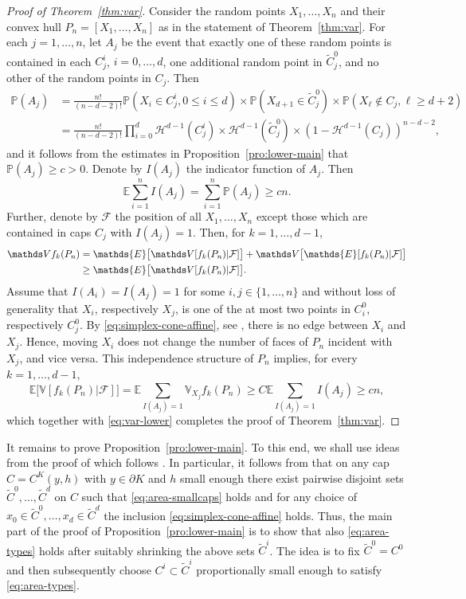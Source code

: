 \documentclass[12pt]{article}
\newcommand{\IE}{\mathds{E}}
\newcommand{\IP}{\mathds{P}}
\def\V{{\mathds V}}
\def\cF{{\mathcal F}}
\def\cH{{\mathcal H}}
\theoremstyle{definition}
\begin{document}
\begin{proof}[Proof of Theorem~\ref{thm:var}]
Consider the random points $X_1,\dots,X_n$ and their convex hull $P_n=[X_1,\dots,X_n]$ as in the statement of Theorem~\ref{thm:var}. For each $j=1,\dots,n$, let $A_j$ be the event that exactly one of these random points is contained in each $C^i_j$, $i=0,\dots,d$, one additional random point in $\tilde{C}_j^0$, and no other of the random points in $C_j$. Then
\begin{align*}
\IP(A_j)
&=\frac{n!}{(n-d-2)!}\IP(X_i\in C^{i}_j,0\le i\le d)\times\IP(X_{d+1}\in \tilde{C}_j^0)\times\IP(X_{\ell}\not\in C_j,\ell\ge d+2)\\
&=\frac{n!}{(n-d-2)!}\prod_{i=0}^d\cH^{d-1}(C^i_j)\times \cH^{d-1}(\tilde{C}_j^0)\times(1-\cH^{d-1}(C_j))^{n-d-2},
\end{align*}
and it follows from the estimates in Proposition~\ref{pro:lower-main} that $\IP(A_j)\ge c>0$.  Denote by $I(A_j)$ the indicator function of $A_j$. Then
\[
\IE\sum_{i=1}^{n}I(A_j)
= \sum_{i=1}^{n}\IP(A_j)
\ge c n.
\]
Further, denote by $\cF$ the position of all $X_1,\dots,X_n$ except those which are contained in caps $C_j$ with $I(A_j)=1$. Then, for $k=1,\dots,d-1$, 
\begin{align} \label{eq:var-lower}
\V f_k(P_n)
&= \IE\big[\V[f_k(P_n)|\cF]\big]+ \V\big[\IE[f_k(P_n)|\cF]\big]\notag\\
&\ge \IE\big[\V[f_k(P_n)|\cF]\big].
\end{align}
Assume that $I(A_i)=I(A_j)=1$ for some $i,j\in \{1,\dots,n\}$ and without loss of generality that $X_i$, respectively $X_j$, is one of the at most two points in $C^0_i$, respectively $C^0_j$. By \eqref{eq:simplex-cone-affine}, see \cite{Reitz05}, there is no edge between $X_i$ and $X_j$. Hence, moving $X_i$ does not change the number of faces of $P_n$ incident with $X_j$, and vice versa. This independence structure of $P_n$ implies, for every $k=1,\dots,d-1$,
\[
\IE\big[\V[f_k(P_n)|\cF]\big]
=\IE\sum_{I(A_j)=1}\V_{X_j}f_k(P_n)
\ge C \IE\sum_{I(A_j)=1}I(A_j)
\ge c n,
\]
which together with \eqref{eq:var-lower} completes the proof of Theorem~\ref{thm:var}.
\end{proof}

It remains to prove Proposition~\ref{pro:lower-main}. To this end, we shall use ideas from the proof of \cite[Theorem~1]{TuWe} which follows \cite{Reitz05,RVW08}. In particular, it follows from \cite[Section~3.1]{TuWe} that on any cap $C=C^K(y,h)$ with $y\in \partial K$ and $h$ small enough there exist pairwise disjoint sets $\tilde C^0,\dots,\tilde C^d$ on $C$ such that \eqref{eq:area-smallcaps} holds and for any choice of $x_0\in \tilde C^0,\dots,x_d\in\tilde C^d$ the inclusion \eqref{eq:simplex-cone-affine} holds. Thus, the main part of the proof of Proposition~\ref{pro:lower-main} is to show that also \eqref{eq:area-types} holds after suitably shrinking the above sets $\tilde C^i$. The idea is to fix $\tilde{C}^0=C^0$ and then subsequently choose $C^i \subset \tilde C^i$ proportionally small enough to satisfy \eqref{eq:area-types}.
\end{document}
